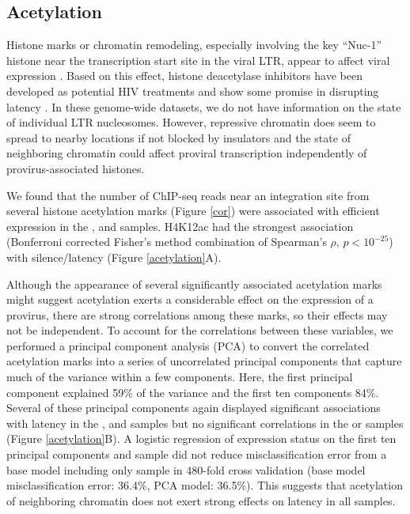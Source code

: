 \documentclass[../sherrill-Mix_thesis.tex]{subfiles}
\begin{document}
	\subsection{Acetylation}
	Histone marks or chromatin remodeling, especially involving the key ``Nuc-1'' histone near the transcription start site in the viral LTR, appear to affect viral expression \citep{Verdin1993,Lint1996,Pearson2008}. Based on this effect, histone deacetylase inhibitors have been developed as potential HIV treatments and show some promise in disrupting latency \citep{Archin2012}. In these genome-wide datasets, we do not have information on the state of individual LTR nucleosomes. However, repressive chromatin does seem to spread to nearby locations if not blocked by insulators \citep{Muller1930,Gaszner2006} and the state of neighboring chromatin could affect proviral transcription independently of provirus-associated histones. 

	We found that the number of ChIP-seq reads near an integration site from several histone acetylation marks (Figure \ref{cor}) were associated with efficient expression in the \Active{}, \Resting{} and \Memory{} samples. H4K12ac had the strongest association (Bonferroni corrected Fisher's method combination of Spearman's $\rho$, $p<10^{-25}$) with silence/latency (Figure \ref{acetylation}A).
	
	Although the appearance of several significantly associated acetylation marks might suggest acetylation exerts a considerable effect on the expression of a provirus, there are strong correlations among these marks, so their effects may not be independent.  To account for the correlations between these variables, we performed a principal component analysis (PCA) to convert the correlated acetylation marks into a series of uncorrelated principal components that capture much of the variance within a few components. Here, the first principal component explained 59\% of the variance and the first ten components 84\%. Several of these principal components again displayed significant associations with latency in the \Active{}, \Resting{} and \Memory{} samples but no significant correlations in the \Bcl{} or \Jurkat{} samples (Figure \ref{acetylation}B). A logistic regression of expression status on the first ten principal components and sample did not reduce misclassification error from a base model including only sample in 480-fold cross validation (base model misclassification error: 36.4\%, PCA model: 36.5\%). This suggests that acetylation of neighboring chromatin does not exert strong effects on latency in all samples.
\end{document}
